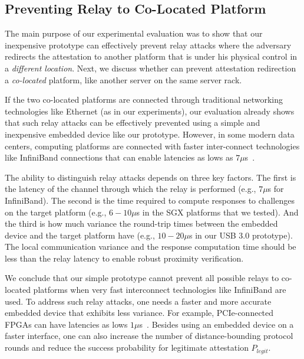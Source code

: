 \subsection{Preventing Relay to Co-Located Platform}
\label{sec:co-located}

The main purpose of our experimental evaluation was to show that our inexpensive \name prototype can effectively prevent relay attacks where the adversary redirects the attestation to another platform that is under his physical control in a \emph{different location}. Next, we discuss whether \name can prevent attestation redirection a \emph{co-located} platform, like another server on the same server rack.

If the two co-located platforms are connected through traditional networking technologies like Ethernet (as in our experiments), our evaluation already shows that such relay attacks can be effectively prevented using a simple and inexpensive embedded device like our prototype. However, in some modern data centers, computing platforms are connected with faster inter-connect technologies like InfiniBand connections that can enable latencies as lows as $7 \mu$s~\cite{liu2003performance}. 

The ability to distinguish relay attacks depends on three key factors. The first is the latency of the channel through which the relay is performed (e.g., $7 \mu$s for InfiniBand). The second is the time required to compute responses to challenges on the target platform (e.g., $6-10 \mu$s in the SGX platforms that we tested). And the third is how much variance the round-trip times between the embedded device and the target platform have (e.g., $10-20 \mu$s in our USB 3.0 prototype). The local communication variance and the response computation time should be less than the relay latency to enable robust proximity verification. 

We conclude that our simple prototype cannot prevent all possible relays to co-located platforms when very fast interconnect technologies like InfiniBand are used. To address such relay attacks, one needs a faster and more accurate embedded device that exhibits less variance. For example, PCIe-connected FPGAs can have latencies as lows $1 \mu $s~\cite{algoLogic}. Besides using an embedded device on a faster interface, one can also increase the number of distance-bounding protocol rounds and reduce the success probability for legitimate attestation $P_{legit}$.


